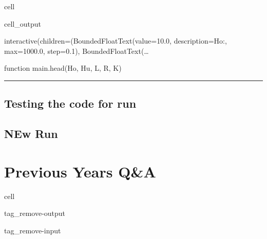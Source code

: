 \documentclass[letterpaper,10pt,english]{jupyterBook}
\begin{document}
\begin{sphinxuseclass}{cell}
\begin{sphinxVerbatimOutput}
\begin{sphinxuseclass}{cell_output}
\begin{sphinxVerbatim}[commandchars=\\\{\}]
interactive(children=(BoundedFloatText(value=10.0, description=\PYGZsq{}Ho:\PYGZsq{}, max=1000.0, step=0.1), BoundedFloatText(…
\end{sphinxVerbatim}

\begin{sphinxVerbatim}[commandchars=\\\{\}]
\PYGZlt{}function \PYGZus{}\PYGZus{}main\PYGZus{}\PYGZus{}.head(Ho, Hu, L, R, K)\PYGZgt{}
\end{sphinxVerbatim}

\end{sphinxuseclass}\end{sphinxVerbatimOutput}

\end{sphinxuseclass}

\bigskip\hrule\bigskip


\sphinxstepscope


\chapter{Testing the code for run}
\label{\detokenize{content/testcodeer:testing-the-code-for-run}}\label{\detokenize{content/testcodeer::doc}}
















\sphinxstepscope


\chapter{NEw Run}
\label{\detokenize{content/tester:new-run}}\label{\detokenize{content/tester::doc}}


\sphinxstepscope


\part{Previous Years Q\&A}

\sphinxstepscope

\begin{sphinxuseclass}{cell}
\begin{sphinxuseclass}{tag_remove-output}
\begin{sphinxuseclass}{tag_remove-input}
\end{sphinxuseclass}
\end{sphinxuseclass}
\end{sphinxuseclass}
\end{document}
